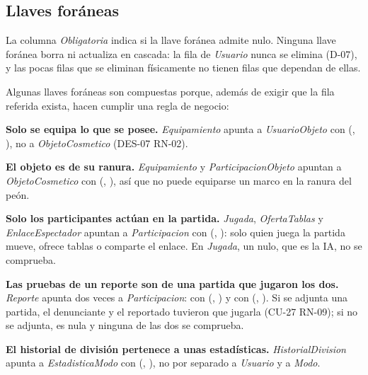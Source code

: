 \subsection*{Llaves foráneas}

La columna \emph{Obligatoria} indica si la llave foránea admite nulo. Ninguna llave foránea borra ni actualiza en cascada: la fila de \textit{Usuario} nunca se elimina (\mbox{D-07}), y las pocas filas que se eliminan físicamente no tienen filas que dependan de ellas.

Algunas llaves foráneas son compuestas porque, además de exigir que la fila referida exista, hacen cumplir una regla de negocio:

\begin{reglas}
  \item \textbf{Solo se equipa lo que se posee.} \textit{Equipamiento} apunta a \textit{UsuarioObjeto} con (, ), no a \textit{ObjetoCosmetico} (\mbox{DES-07} \mbox{RN-02}).
  \item \textbf{El objeto es de su ranura.} \textit{Equipamiento} y \textit{ParticipacionObjeto} apuntan a \textit{ObjetoCosmetico} con (, ), así que no puede equiparse un marco en la ranura del peón.
  \item \textbf{Solo los participantes actúan en la partida.} \textit{Jugada}, \textit{OfertaTablas} y \textit{EnlaceEspectador} apuntan a \textit{Participacion} con (, ): solo quien juega la partida mueve, ofrece tablas o comparte el enlace. En \textit{Jugada}, un  nulo, que es la IA, no se comprueba.
  \item \textbf{Las pruebas de un reporte son de una partida que jugaron los dos.} \textit{Reporte} apunta dos veces a \textit{Participacion}: con (, ) y con (, ). Si se adjunta una partida, el denunciante y el reportado tuvieron que jugarla (\mbox{CU-27} \mbox{RN-09}); si no se adjunta,  es nula y ninguna de las dos se comprueba.
  \item \textbf{El historial de división pertenece a unas estadísticas.} \textit{HistorialDivision} apunta a \textit{EstadisticaModo} con (, ), no por separado a \textit{Usuario} y a \textit{Modo}.
\end{reglas}


